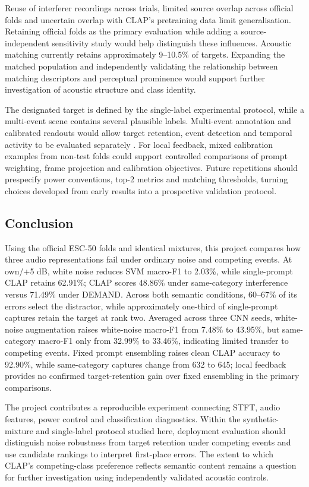 \documentclass[a4paper,10pt]{article}
\begin{document}
Reuse of interferer recordings across trials, limited source overlap across official folds and uncertain overlap with CLAP's pretraining data limit generalisation. Retaining official folds as the primary evaluation while adding a source-independent sensitivity study would help distinguish these influences. Acoustic matching currently retains approximately 9--10.5\% of targets. Expanding the matched population and independently validating the relationship between matching descriptors and perceptual prominence would support further investigation of acoustic structure and class identity.

The designated target is defined by the single-label experimental protocol, while a multi-event scene contains several plausible labels. Multi-event annotation and calibrated readouts would allow target retention, event detection and temporal activity to be evaluated separately \cite{sed}. For local feedback, mixed calibration examples from non-test folds could support controlled comparisons of prompt weighting, frame projection and calibration objectives. Future repetitions should prespecify power conventions, top-2 metrics and matching thresholds, turning choices developed from early results into a prospective validation protocol.

\subsection{Conclusion}

Using the official ESC-50 folds and identical mixtures, this project compares how three audio representations fail under ordinary noise and competing events. At own/+5 dB, white noise reduces SVM macro-F1 to 2.03\%, while single-prompt CLAP retains 62.91\%; CLAP scores 48.86\% under same-category interference versus 71.49\% under DEMAND. Across both semantic conditions, 60--67\% of its errors select the distractor, while approximately one-third of single-prompt captures retain the target at rank two. Averaged across three CNN seeds, white-noise augmentation raises white-noise macro-F1 from 7.48\% to 43.95\%, but same-category macro-F1 only from 32.99\% to 33.46\%, indicating limited transfer to competing events. Fixed prompt ensembling raises clean CLAP accuracy to 92.90\%, while same-category captures change from 632 to 645; local feedback provides no confirmed target-retention gain over fixed ensembling in the primary comparisons.

The project contributes a reproducible experiment connecting STFT, audio features, power control and classification diagnostics. Within the synthetic-mixture and single-label protocol studied here, deployment evaluation should distinguish noise robustness from target retention under competing events and use candidate rankings to interpret first-place errors. The extent to which CLAP's competing-class preference reflects semantic content remains a question for further investigation using independently validated acoustic controls.
\end{document}
